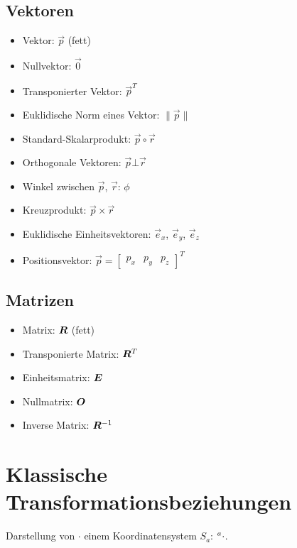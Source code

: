 		\subsection{Vektoren}
			\begin{itemize}
				\item Vektor:                        \tabto{5.5cm} \( \vec{p} \) (fett)
				\item Nullvektor:                    \tabto{5.5cm} \( \vec{0} \)
				\item Transponierter Vektor:         \tabto{5.5cm} \( \vec{p}^T  \)
				\item Euklidische Norm eines Vektor: \tabto{5.5cm} \( \lVert \vec{p} \rVert \)
				\item Standard-Skalarprodukt:        \tabto{5.5cm} \( \vec{p} \circ \vec{r} \)
				\item Orthogonale Vektoren:          \tabto{5.5cm} \( \vec{p} \bot \vec{r} \)
				\item Winkel zwischen                \tabto{5.5cm} \(\vec{p}\), \(\vec{r}\): \( \phi \)
				\item Kreuzprodukt:                  \tabto{5.5cm} \( \vec{p} \times \vec{r} \)
				\item Euklidische Einheitsvektoren:  \tabto{5.5cm} \( \vec{e}_x \), \( \vec{e}_y \), \( \vec{e}_z \)
				\item Positionsvektor:               \tabto{5.5cm} \( \vec{p} = \begin{bmatrix} p_x & p_y & p_z \end{bmatrix}^T \)
			\end{itemize}

		\subsection{Matrizen}
			\begin{itemize}
				\item Matrix:               \tabto{4cm} \( \bm{R} \) (fett)
				\item Transponierte Matrix: \tabto{4cm} \( \bm{R}^T \)
				\item Einheitsmatrix:       \tabto{4cm} \( \bm{E} \)
				\item Nullmatrix:           \tabto{4cm} \( \bm{O} \)
				\item Inverse Matrix:       \tabto{4cm} \( \bm{R}^{-1} \)
			\end{itemize}

	\section{Klassische Transformationsbeziehungen}
		Darstellung von \( \cdot \) \bzgl einem Koordinatensystem \( S_a \): \( \prescript{a}{}{\cdot} \).

